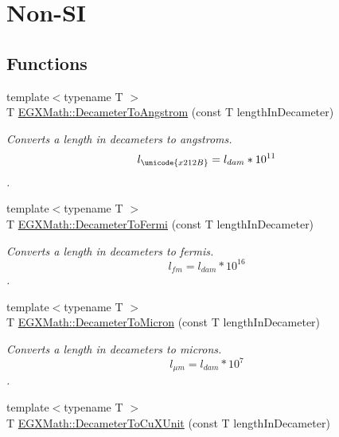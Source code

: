 \hypertarget{group___e_g_x_math-_conversions-_length_conversions-_s_i-_decameter-_non-_s_i}{}\section{Non-\/\+SI}
\label{group___e_g_x_math-_conversions-_length_conversions-_s_i-_decameter-_non-_s_i}
\subsection*{Functions}
\begin{DoxyCompactItemize}
\item 
{\footnotesize template$<$typename T $>$ }\\T \mbox{\hyperlink{group___e_g_x_math-_conversions-_length_conversions-_s_i-_decameter-_non-_s_i_ga2ea722ea1c773432c2680fe6ebd67638}{E\+G\+X\+Math\+::\+Decameter\+To\+Angstrom}} (const T length\+In\+Decameter)
\begin{DoxyCompactList}\small\item\em Converts a length in decameters to angstroms. \[ l_{\unicode{x212B}}=l_{dam} * 10^{11} \]. \end{DoxyCompactList}\item 
{\footnotesize template$<$typename T $>$ }\\T \mbox{\hyperlink{group___e_g_x_math-_conversions-_length_conversions-_s_i-_decameter-_non-_s_i_gadc348f062b782f64f13784377f032f9b}{E\+G\+X\+Math\+::\+Decameter\+To\+Fermi}} (const T length\+In\+Decameter)
\begin{DoxyCompactList}\small\item\em Converts a length in decameters to fermis. \[ l_{fm}=l_{dam} * 10^{16} \]. \end{DoxyCompactList}\item 
{\footnotesize template$<$typename T $>$ }\\T \mbox{\hyperlink{group___e_g_x_math-_conversions-_length_conversions-_s_i-_decameter-_non-_s_i_gaf3c7befd051b823dc17aca5318cae689}{E\+G\+X\+Math\+::\+Decameter\+To\+Micron}} (const T length\+In\+Decameter)
\begin{DoxyCompactList}\small\item\em Converts a length in decameters to microns. \[ l_{\mu m}=l_{dam} * 10^{7} \]. \end{DoxyCompactList}\item 
{\footnotesize template$<$typename T $>$ }\\T \mbox{\hyperlink{group___e_g_x_math-_conversions-_length_conversions-_s_i-_decameter-_non-_s_i_gaf256500ca4f0b7a62018ea61078c29e3}{E\+G\+X\+Math\+::\+Decameter\+To\+Cu\+X\+Unit}} (const T length\+In\+Decameter)

\end{DoxyCompactItemize}
